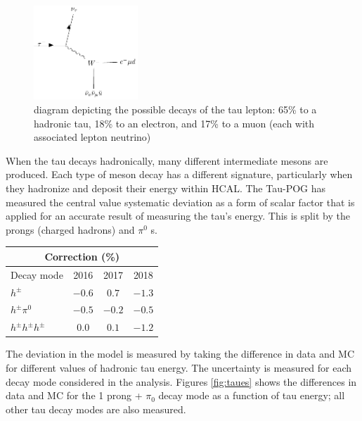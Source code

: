 \begin{figure}[ht!b]
\begin{center}
  \includegraphics[width=0.35\textwidth]{"Figures/taudecay.pdf"}
    \caption{\label{fig:taudecay} diagram depicting the possible decays of the tau lepton: 65\% to a hadronic tau, 18\% to an electron, and 17\% to a muon (each with associated lepton neutrino)}
\end{center}
\end{figure} 
When the tau decays hadronically, many different intermediate mesons are produced. Each type of meson decay has a different signature, particularly when they hadronize and deposit their energy within HCAL. The Tau-POG has measured the central value systematic deviation as a form of scalar factor that is applied for an accurate result of measuring the tau's energy. This is split by the prongs (charged hadrons) and $\pi^0$ s.  

\begin{table}[h]
  \begin{center}
    \label{tab:TES}
    \begin{tabular} { l | c  c  c }
      \hline \multicolumn{4}{c}{Correction (\%)} \\
      \hline Decay mode & 2016 & 2017 & 2018 \\ \hline
      $h^{\pm}$ & $-0.6$ & $0.7$ & $-1.3$  \\ 
      $h^{\pm}\pi^{0}$ & $-0.5$ & $-0.2$ & $-0.5$  \\ 
      $h^{\pm}h^{\pm}h^{\pm}$ & $0.0$ & $0.1$ & $-1.2$ \\ 
    \end{tabular}
  \end{center}
\end{table}

The deviation in the model is measured by taking the difference in data and MC for different values of hadronic tau energy. The uncertainty is measured for each decay mode considered in the analysis. Figures \ref{fig:taues} shows the differences in data and MC for the 1 prong + $\pi_0$ decay mode as a function of tau energy; all other tau decay modes are also measured. 

